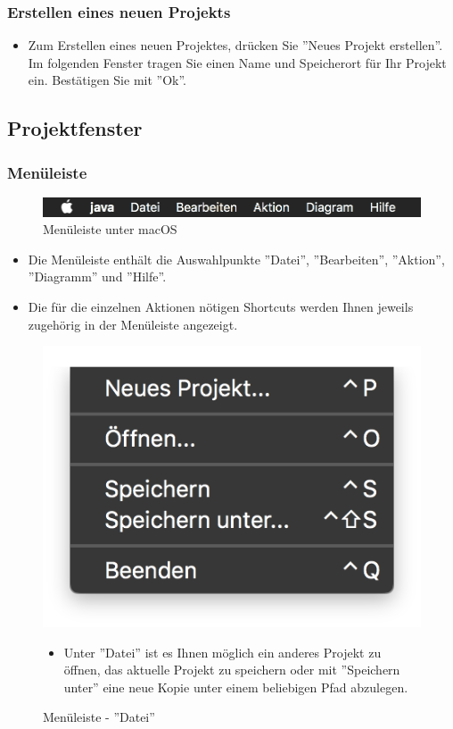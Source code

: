 \subsubsection{Erstellen eines neuen Projekts}
\begin{itemize}
\item Zum Erstellen eines neuen Projektes, drücken Sie ''Neues Projekt erstellen''. Im folgenden Fenster tragen Sie einen Name und Speicherort für Ihr Projekt ein. Bestätigen Sie mit ''Ok''.  
\end{itemize}

\subsection{Projektfenster}
\subsubsection{Menüleiste}
\begin{figure}[h!]
	\centering
	\includegraphics[width=1.0\textwidth]{Leiste.png}
	\caption{Menüleiste unter macOS}
\end{figure}
\begin{itemize}
\item Die Menüleiste enthält die Auswahlpunkte ''Datei'', ''Bearbeiten'', ''Aktion'', ''Diagramm'' und ''Hilfe''.
\item Die für die einzelnen Aktionen nötigen Shortcuts werden Ihnen jeweils zugehörig in der Menüleiste angezeigt. 
\end{itemize}

\begin{figure}[h!]
	\centering
	\includegraphics[width=.4\textwidth]{Leiste_Datei.png}
	\caption{Menüleiste - ''Datei''}
\begin{itemize}
\item Unter ''Datei'' ist es Ihnen möglich ein anderes Projekt zu öffnen, das aktuelle Projekt zu speichern oder mit ''Speichern unter'' eine neue Kopie unter einem beliebigen Pfad abzulegen.
\end{itemize}
\end{figure}


